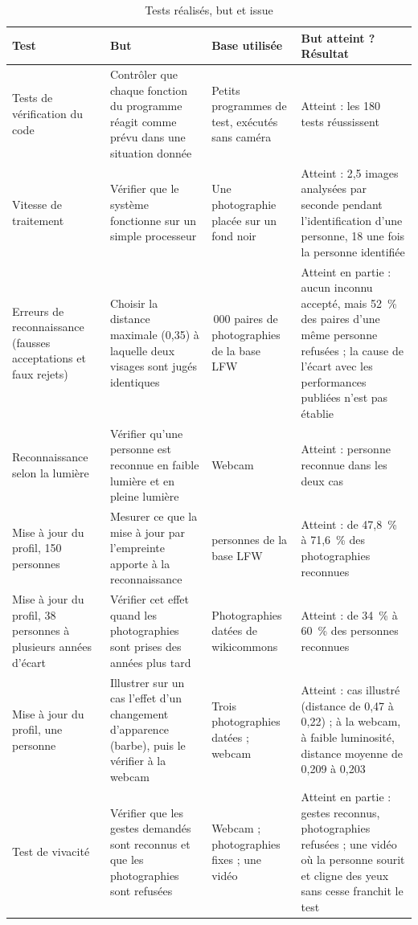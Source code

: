 \begin{table}[H]
\centering
\caption{Tests réalisés, but et issue\majmark}\label{tab:alltests}
\small
\begin{tabularx}{\textwidth}{@{}>{\raggedright\arraybackslash}p{3.1cm}>{\raggedright\arraybackslash}X>{\raggedright\arraybackslash}p{2.7cm}>{\raggedright\arraybackslash}p{4.2cm}@{}}
\toprule
\textbf{Test} & \textbf{But} & \textbf{Base utilisée} & \textbf{But atteint ? Résultat} \\
\midrule
Tests de vérification du code & Contrôler que chaque fonction du programme réagit comme prévu dans une situation donnée & Petits programmes de test, exécutés sans caméra & Atteint : les 180 tests réussissent \\
Vitesse de traitement & Vérifier que le système fonctionne sur un simple processeur & Une photographie placée sur un fond noir & Atteint : 2,5 images analysées par seconde pendant l'identification d'une personne, 18 une fois la personne identifiée \\
Erreurs de reconnaissance (fausses acceptations et faux rejets) & Choisir la distance maximale (0,35) à laquelle deux visages sont jugés identiques & 1\,000 paires de photographies de la base LFW & Atteint en partie : aucun inconnu accepté, mais 52~\% des paires d'une même personne refusées ; la cause de l'écart avec les performances publiées n'est pas établie \\
Reconnaissance selon la lumière & Vérifier qu'une personne est reconnue en faible lumière et en pleine lumière & Webcam & Atteint : personne reconnue dans les deux cas \\
Mise à jour du profil, 150 personnes & Mesurer ce que la mise à jour par l'empreinte apporte à la reconnaissance & 150 personnes de la base LFW & Atteint : de 47,8~\% à 71,6~\% des photographies reconnues \\
Mise à jour du profil, 38 personnes à plusieurs années d'écart & Vérifier cet effet quand les photographies sont prises des années plus tard & Photographies datées de \gls{wikicommons} & Atteint : de 34~\% à 60~\% des personnes reconnues \\
Mise à jour du profil, une personne & Illustrer sur un cas l'effet d'un changement d'apparence (barbe), puis le vérifier à la webcam & Trois photographies datées ; webcam & Atteint : cas illustré (distance de 0,47 à 0,22) ; à la webcam, à faible luminosité, distance moyenne de 0,209 à 0,203\nouvmark{} \\
Test de vivacité & Vérifier que les gestes demandés sont reconnus et que les photographies sont refusées & Webcam ; photographies fixes ; une vidéo & Atteint en partie : gestes reconnus, photographies refusées ; une vidéo où la personne sourit et cligne des yeux sans cesse franchit le test \\

\end{tabularx}
\end{table}
